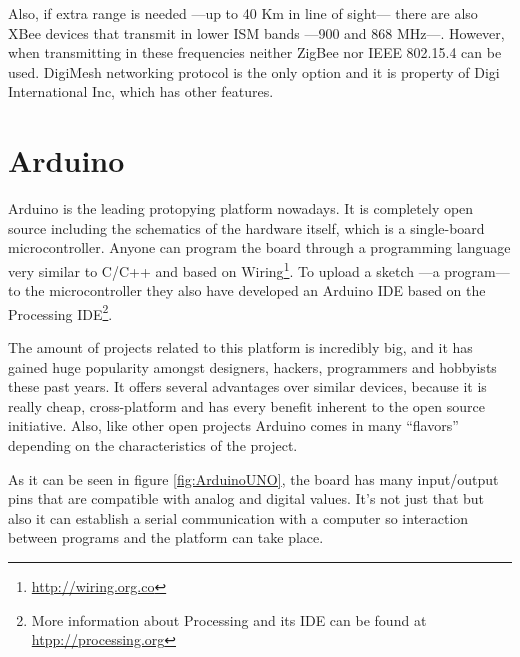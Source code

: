 
Also, if extra range is needed ---up to 40 Km in line of sight--- there are also XBee\textregistered{} devices that transmit in lower ISM bands ---900 and 868 MHz---. However, when transmitting in these frequencies neither ZigBee nor IEEE 802.15.4 can be used. DigiMesh\texttrademark{} networking protocol is the only option and it is property of Digi International Inc, which has other features.



\section{Arduino}

Arduino is the leading protopying platform nowadays. It is completely open source including the schematics of the hardware itself, which is a single-board microcontroller. Anyone can program the board through a programming language very similar to C/C++ and based on Wiring\footnote{\url{http://wiring.org.co}}. To upload a sketch ---a program--- to the microcontroller they also have developed an Arduino IDE based on the Processing IDE\footnote{More information about Processing and its IDE can be found at \url{htpp://processing.org}}.

The amount of projects related to this platform is incredibly big, and it has gained huge popularity amongst designers, hackers, programmers and hobbyists these past years. It offers several advantages over similar devices, because it is really cheap, cross-platform and has every benefit inherent to the open source initiative. Also, like other open projects Arduino comes in many ``flavors'' depending on the characteristics of the project.

As it can be seen in figure \ref{fig:ArduinoUNO}, the board has many input/output pins that are compatible with analog and digital values. It's not just that but also it can establish a serial communication with a computer so interaction between programs and the platform can take place.



